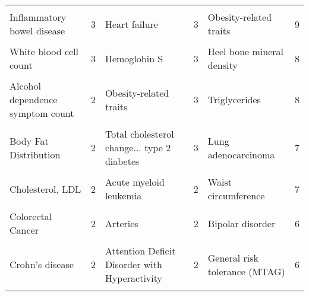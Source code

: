 \begin{table}[!htbp]
{\begin{tabular}[t]{lrlrlr}
\cellcolor{gray!6}{Hip} & \cellcolor{gray!6}{3} & \cellcolor{gray!6}{Triglycerides} & \cellcolor{gray!6}{4} & \cellcolor{gray!6}{Chronotype} & \cellcolor{gray!6}{9}\\
Inflammatory bowel disease & 3 & Heart failure & 3 & Obesity-related traits & 9\\
\cellcolor{gray!6}{Platelet Count} & \cellcolor{gray!6}{3} & \cellcolor{gray!6}{Heel bone mineral density} & \cellcolor{gray!6}{3} & \cellcolor{gray!6}{Schizophrenia} & \cellcolor{gray!6}{9}\\
White blood cell count & 3 & Hemoglobin S & 3 & Heel bone mineral density & 8\\
\cellcolor{gray!6}{Alcohol Drinking} & \cellcolor{gray!6}{2} & \cellcolor{gray!6}{Lipids} & \cellcolor{gray!6}{3} & \cellcolor{gray!6}{Inborn genetic diseases} & \cellcolor{gray!6}{8}\\
Alcohol dependence symptom count & 2 & Obesity-related traits & 3 & Triglycerides & 8\\
\cellcolor{gray!6}{Asthma age of onset} & \cellcolor{gray!6}{2} & \cellcolor{gray!6}{Schizophrenia} & \cellcolor{gray!6}{3} & \cellcolor{gray!6}{Asthma} & \cellcolor{gray!6}{7}\\
Body Fat Distribution & 2 & Total cholesterol change... type 2 diabetes & 3 & Lung adenocarcinoma & 7\\
\cellcolor{gray!6}{Celiac disease and Rheumatoid arthritis} & \cellcolor{gray!6}{2} & \cellcolor{gray!6}{squamous cell lung carcinoma} & \cellcolor{gray!6}{3} & \cellcolor{gray!6}{Smoking status (ever vs never smokers)} & \cellcolor{gray!6}{7}\\
Cholesterol, LDL & 2 & Acute myeloid leukemia & 2 & Waist circumference & 7\\
\cellcolor{gray!6}{Chronotype} & \cellcolor{gray!6}{2} & \cellcolor{gray!6}{Amyotrophic lateral sclerosis (sporadic)} & \cellcolor{gray!6}{2} & \cellcolor{gray!6}{Adventurousness} & \cellcolor{gray!6}{6}\\
Colorectal Cancer & 2 & Arteries & 2 & Bipolar disorder & 6\\
\cellcolor{gray!6}{Creatinine} & \cellcolor{gray!6}{2} & \cellcolor{gray!6}{Asthma} & \cellcolor{gray!6}{2} & \cellcolor{gray!6}{Diabetes Mellitus} & \cellcolor{gray!6}{6}\\
Crohn's disease & 2 & Attention Deficit Disorder with Hyperactivity & 2 & General risk tolerance (MTAG) & 6\\
\cellcolor{gray!6}{Diastolic blood pressure x alcohol consumption ...} & \cellcolor{gray!6}{2} & \cellcolor{gray!6}{Basal cell carcinoma} & \cellcolor{gray!6}{2} & \cellcolor{gray!6}{Glucose} & \cellcolor{gray!6}{6}\\

\end{tabular}}
\end{table}
